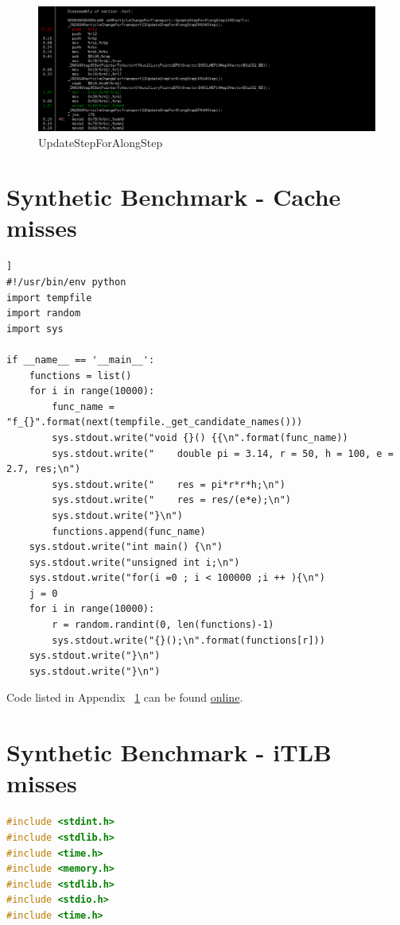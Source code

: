 \documentclass[a4paper]{jpconf}
\begin{document}
\begin{appendices}
\begin{figure}[H]
\begin{center}
\includegraphics[scale=0.35]{images/UpdateForAlongStep_P8.png}
\caption{UpdateStepForAlongStep}
\end{center}
\end{figure}

\section{Synthetic Benchmark - Cache misses}

\label{appendix:synthetic-benchmark-cache-misses}
\begin{lstlisting}[caption=Python code which generates the synthetic benchmark]]
#!/usr/bin/env python
import tempfile
import random
import sys

if __name__ == '__main__':
    functions = list()
    for i in range(10000):
        func_name = "f_{}".format(next(tempfile._get_candidate_names()))
        sys.stdout.write("void {}() {{\n".format(func_name))
        sys.stdout.write("    double pi = 3.14, r = 50, h = 100, e = 2.7, res;\n")
        sys.stdout.write("    res = pi*r*r*h;\n")
        sys.stdout.write("    res = res/(e*e);\n")
        sys.stdout.write("}\n")
        functions.append(func_name)
    sys.stdout.write("int main() {\n")
    sys.stdout.write("unsigned int i;\n")
    sys.stdout.write("for(i =0 ; i < 100000 ;i ++ ){\n")
    j = 0
    for i in range(10000):
        r = random.randint(0, len(functions)-1)
        sys.stdout.write("{}();\n".format(functions[r]))
    sys.stdout.write("}\n")
    sys.stdout.write("}\n")
\end{lstlisting}

Code listed in Appendix ~\ref{appendix:synthetic-benchmark-cache-misses} can be found 
\href{www.google.it}{online}.

\section{Synthetic Benchmark - iTLB misses}
\label{appendix:synthetic-benchmark-itlb} 
\begin{lstlisting}[caption=Synthetic benchmark using a code segment of adjustable size, language=c]
#include <stdint.h>
#include <stdlib.h>
#include <time.h>
#include <memory.h>
#include <stdlib.h>
#include <stdio.h>
#include <time.h>


\end{lstlisting}
\end{appendices}
\end{document}
